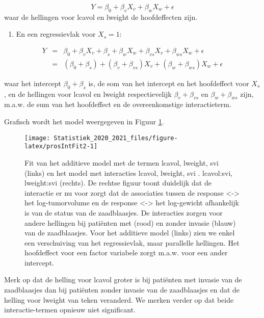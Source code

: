 \documentclass[
  12pt,dutch,coursenotes]{book}
\providecommand{\tightlist}{%
  \setlength{\itemsep}{0pt}\setlength{\parskip}{0pt}}
\theoremstyle{definition}
\theoremstyle{definition}
\theoremstyle{definition}
\theoremstyle{remark}
\begin{document}
\[Y=\beta_0+\beta_vX_v+\beta_wX_w + \epsilon\] waar de hellingen voor lcavol en lweight de hoofdeffecten zijn.

\begin{enumerate}
\def\labelenumi{\arabic{enumi}.}
\setcounter{enumi}{1}
\tightlist
\item
  En een regressievlak voor \(X_s=1\):
\end{enumerate}

\[
  \begin{array}{lcl}
  Y&=&\beta_0+\beta_vX_v+\beta_s+\beta_wX_w+\beta_{vs}X_v + \beta_{ws}X_w +\epsilon\\
  &=&(\beta_0+\beta_s)+(\beta_v+\beta_{vs})X_v+(\beta_w+\beta_{ws})X_w+\epsilon
  \end{array}
  \]

waar het intercept \(\beta_0 + \beta_s\) is, de som van het intercept en het hoofdeffect voor \(X_s\), en de hellingen voor lcavol en lweight respectievelijk \(\beta_v+\beta_{vs}\) en \(\beta_w+\beta_{ws}\) zijn, m.a.w. de sum van het hoofdeffect en de overeenkomstige interactieterm.

Grafisch wordt het model weergegeven in Figuur \ref{fig:prosIntFit2}.

\begin{figure}

{\centering \texttt{[image: Statistiek\_2020\_2021\_files/figure-latex/prosIntFit2-1]} 

}

\caption{Fit van het additieve model met de termen lcavol, lweight, svi (links) en het model met interacties lcavol, lweight, svi . lcavol:svi, lweight:svi (rechts). De rechtse figuur toont duidelijk dat de interactie er nu voor zorgt dat de associaties tussen de response <-> het log-tumorvolume en de response <-> het log-gewicht afhankelijk is van de status van de zaadblaasjes. De interacties zorgen voor andere hellingen bij patiënten met (rood) en zonder invasie (blauw) van de zaadblaasjes. Voor het additieve model (links) zien we enkel een verschuiving van het regressievlak, maar parallelle hellingen. Het hoofdeffect voor een factor variabele zorgt m.a.w. voor een ander intercept.}\label{fig:prosIntFit2}
\end{figure}

Merk op dat de helling voor lcavol groter is bij patiënten met invasie van de zaadblaasjes dan bij patiënten zonder invasie van de zaadblaasjes en dat de helling voor lweight van teken veranderd. We merken verder op dat beide interactie-termen opnieuw niet significant.
\end{document}
